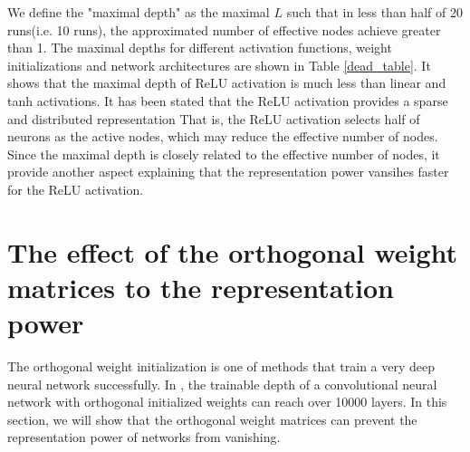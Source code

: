 We define the "maximal depth" as the maximal $L$ such that in less than half of 20
runs(i.e. 10 runs), the approximated number of effective nodes achieve greater than 1.
The maximal depths for different activation functions, weight initializations and network
architectures are shown in Table \ref{dead_table}. It shows that the maximal depth of ReLU
activation is much less than linear and tanh activations. It has been stated
\cite{relu_sparse} that the ReLU activation provides a sparse and distributed representation
That is, the ReLU activation selects half of neurons as the active nodes, which may reduce the
effective number of nodes. Since the maximal depth is closely related to the effective number
of nodes, it provide another aspect explaining that the representation power vansihes
faster for the ReLU activation.



\section{The effect of the orthogonal weight matrices to the representation power} \label{repr_orthogonal}

The orthogonal weight initialization \cite{mft:linear} is one of methods that train a very
deep neural network successfully. In \cite{mft:cnn}, the trainable depth of a convolutional
neural network with orthogonal initialized weights can reach over 10000 layers. In this
section, we will show that the orthogonal weight matrices can prevent the representation
power of networks from vanishing.

